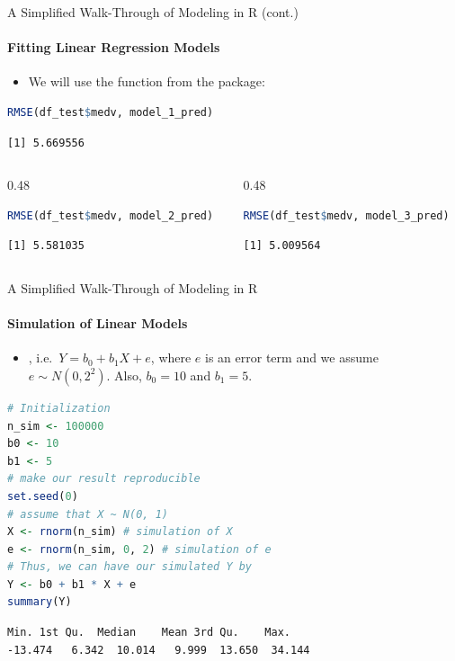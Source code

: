 \begin{frame}[fragile]{A Simplified Walk-Through of Modeling in R (cont.)}
\framesubtitle{Fitting Linear Regression Models}
\begin{itemize}
  \item We will use the  function from the  package:
\end{itemize}
\begin{lstlisting}[language=R]
RMSE(df_test$medv, model_1_pred)
\end{lstlisting}
\begin{lstlisting}[style=output]
[1] 5.669556
\end{lstlisting}
\begin{columns}[T]
\begin{column}{0.48\textwidth}
\begin{lstlisting}[language=R]
RMSE(df_test$medv, model_2_pred)
\end{lstlisting}
\begin{lstlisting}[style=output]
[1] 5.581035
\end{lstlisting}
\end{column}
\begin{column}{0.48\textwidth}
\begin{lstlisting}[language=R]
RMSE(df_test$medv, model_3_pred)
\end{lstlisting}
\begin{lstlisting}[style=output]
[1] 5.009564
\end{lstlisting}
\end{column}
\end{columns}
\end{frame}

\begin{frame}[fragile]{A Simplified Walk-Through of Modeling in R}
\framesubtitle{Simulation of Linear Models}
\begin{itemize}
  \item {}, i.e.\ $Y = b_0 + b_1 X + e$, where $e$ is an error term and we assume $e \sim N(0, 2^2)$. Also, $b_0 = 10$ and $b_1 = 5$.
\end{itemize}
\begin{lstlisting}[language=R]
# Initialization
n_sim <- 100000
b0 <- 10
b1 <- 5
# make our result reproducible
set.seed(0)
# assume that X ~ N(0, 1)
X <- rnorm(n_sim) # simulation of X
e <- rnorm(n_sim, 0, 2) # simulation of e
# Thus, we can have our simulated Y by
Y <- b0 + b1 * X + e
summary(Y)
\end{lstlisting}
\begin{lstlisting}[style=output]
   Min. 1st Qu.  Median    Mean 3rd Qu.    Max. 
-13.474   6.342  10.014   9.999  13.650  34.144
\end{lstlisting}
\end{frame}

